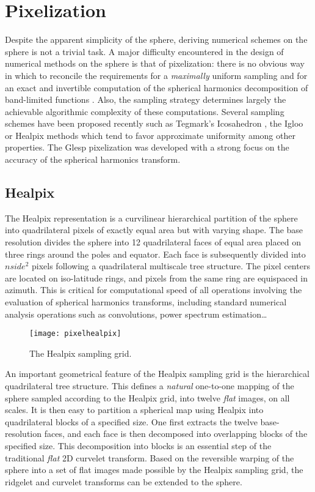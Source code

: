 \section{Pixelization}

Despite the apparent simplicity of the sphere, deriving numerical schemes on the sphere is not a trivial task. A major difficulty encountered 
in the design of numerical methods on the sphere is that of pixelization: there is no obvious way in which to reconcile the requirements 
for a \emph{maximally} uniform sampling and for an exact and invertible computation of the spherical harmonics decomposition of band-limited 
functions \cite{healpix,icosahedron}. Also, the sampling strategy determines largely the achievable algorithmic complexity of these computations. 
Several sampling schemes have been proposed recently such as Tegmark's Icosahedron \cite{icosahedron}, the Igloo \cite{igloo} or Healpix \cite{healpix} 
methods which tend to favor approximate uniformity among other properties. The Glesp \cite{glesp} pixelization was developed with a strong 
focus on the accuracy of the spherical harmonics transform. 

\subsection*{Healpix}

The Healpix representation is a curvilinear hierarchical partition of the sphere into quadrilateral pixels of exactly equal area but with 
varying shape. The base resolution divides the sphere into 12 quadrilateral faces of equal area placed on three rings around the poles 
and equator. Each face is subsequently divided into $nside^{2}$ pixels following a quadrilateral multiscale tree structure. The pixel 
centers are located on iso-latitude rings, and pixels from the same ring are equispaced in azimuth. This is critical for computational 
speed of all operations involving the evaluation of spherical harmonics transforms, including standard numerical analysis operations such 
as convolutions, power spectrum estimation\ldots \\

\begin{figure}
\centering
\texttt{[image: pixelhealpix]}
\caption{The Healpix sampling grid.}
\label{pixelhealpix}
\end{figure}

An important geometrical feature of the Healpix sampling grid is the hierarchical quadrilateral tree structure. This defines a \emph{natural} 
one-to-one mapping of the sphere sampled according to the Healpix grid, into twelve \emph{flat} images, on all scales. It is then easy to 
partition a spherical map using Healpix into quadrilateral blocks of a specified size. One first extracts the twelve base-resolution faces, 
and each face is then decomposed into overlapping blocks of the specified size. This decomposition into blocks is an essential step of the 
traditional \emph{flat} 2D curvelet transform. Based on the reversible warping of the sphere into a set of flat images made possible by the 
Healpix sampling grid, the ridgelet and curvelet transforms can be extended to the sphere. 

